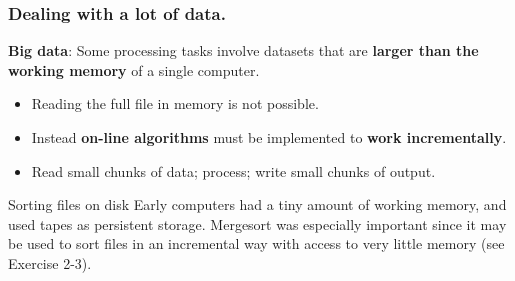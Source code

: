 \documentclass{beamer} %
\newcommand\emc[1]{\textcolor{brightblue}{\textbf{#1}}}
\begin{document}


\begin{frame}
\frametitle{Dealing with a lot of data.}

\emc{Big data}: Some processing tasks involve datasets that are \emc{larger than the working memory} of a single computer.
\begin{itemize}
\item Reading the full file in memory is not possible.
\item Instead \emc{on-line algorithms} must be implemented to \emc{work incrementally}.
\item Read small chunks of data; process; write small chunks of output.
\end{itemize}

\begin{block}{Sorting files on disk}
Early computers had a tiny amount of working memory, and used tapes as persistent storage. Mergesort was especially important since it may be used to sort files in an incremental way with access to very little memory (see Exercise 2-3).
\end{block}

\end{frame}
\end{document}
